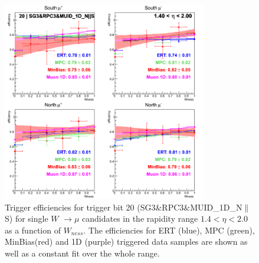 \begin{figure}[h!]

  \centering

  \includegraphics[width=0.8\textwidth]{./figures/run13_trigeffisn_eta1_trig20_lin.png}
  \caption{\label{fig:run13_trigeffisn_eta1_nper0_trig20_lin} Trigger efficiencies for trigger bit 20 (SG3\&RPC3\&MUID\_1D\_N$\|$S) for single $W$ $\rightarrow \mu$ candidates in the rapidity range $ 1.4 < \eta < 2.0$ as a function of $W_{ness}$. The efficiencies for ERT (blue), MPC (green), MinBias(red) and 1D (purple) triggered data samples are shown as well as a constant fit over the whole range.}

\end{figure}
\clearpage
